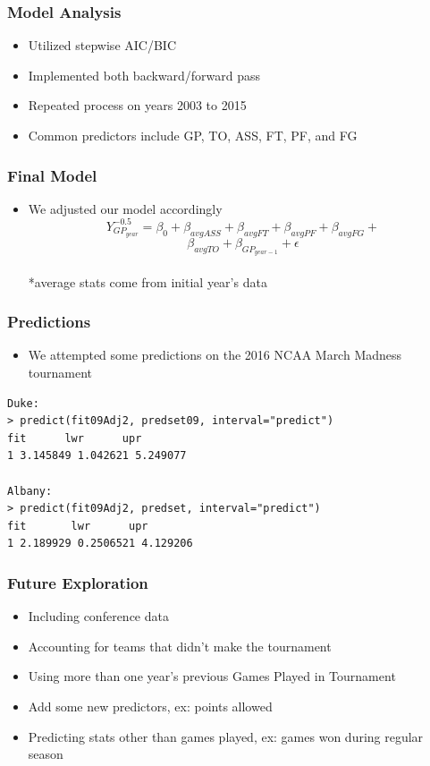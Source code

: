 \documentclass[11pt]{beamer}
\begin{document}
\begin{frame}
\frametitle{{\textbf{\huge Model Analysis}}}
\begin{itemize}
	\item Utilized stepwise AIC/BIC
	\item Implemented both backward/forward pass
	\item Repeated process on years 2003 to 2015
	\item Common predictors include GP, TO, ASS, FT, PF, and FG
\end{itemize}
\end{frame}
\begin{frame}
\frametitle{{\textbf{\huge Final Model}}}
\begin{itemize}
	\item We adjusted our model accordingly
	\large
	\[
	Y_{GP_{year}}^{-0.5} = \beta_0 + \beta_{avgASS} +\beta_{avgFT} + \beta_{avgPF} + \beta_{avgFG} + 
	\]
	\[
	\beta_{avgTO} + \beta_{GP_{year-1}}+ \epsilon 
	\]
	\\
	\footnotesize
	*average stats come from initial year's data
\end{itemize}
\end{frame}
\begin{frame}[fragile]
\frametitle{{\textbf{\huge Predictions}}}
\begin{itemize}
	\item We attempted some predictions on the 2016 NCAA March Madness tournament
\end{itemize}
\begin{verbatim}
Duke:
> predict(fit09Adj2, predset09, interval="predict")
fit      lwr      upr
1 3.145849 1.042621 5.249077

Albany:
> predict(fit09Adj2, predset, interval="predict")
fit       lwr      upr
1 2.189929 0.2506521 4.129206
\end{verbatim}
\end{frame}
\begin{frame}
\frametitle{{\textbf{\huge Future Exploration}}}
\begin{itemize}
	\item Including conference data
	\item Accounting for teams that didn't make the tournament
	\item Using more than one year's previous Games Played in Tournament
	\item Add some new predictors, ex: points allowed
	\item Predicting stats other than games played, ex: games won during regular season
\end{itemize}
\end{frame}
\end{document}
